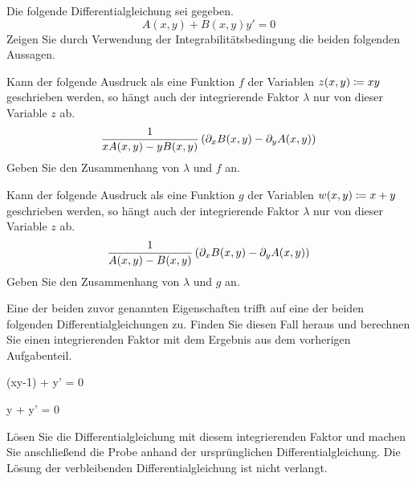 \begin{atiTask}[
	title = Integrierende Faktoren,
	topic = Gewöhnliche Differentialgleichungen,
	subtopic = Exakte Differentialgleichungen: Der integrierende Faktor,
	language = Deutsch
]
	\begin{atiSubtasks}
		\item{
			Die folgende Differentialgleichung sei gegeben.
			\[
				A(x,y) + B(x,y)y' = 0
			\]
			Zeigen Sie durch Verwendung der Integrabilitätsbedingung die beiden folgenden Aussagen.
			\begin{atiItems}
				\item{
					Kann der folgende Ausdruck als eine Funktion $f$ der Variablen $z(x,y)\coloneqq xy$ geschrieben werden, so hängt auch der integrierende Faktor $\lambda$ nur von dieser Variable $z$ ab.
					\[
						\frac{1}{xA(x,y)-yB(x,y)}\left( \partial_x B(x,y) - \partial_y A(x,y) \right)
					\]
					Geben Sie den Zusammenhang von $\lambda$ und $f$ an.
				}
				\item{
					Kann der folgende Ausdruck als eine Funktion $g$ der Variablen $w(x,y)\coloneqq x + y$ geschrieben werden, so hängt auch der integrierende Faktor $\lambda$ nur von dieser Variable $z$ ab.
					\[
						\frac{1}{A(x,y)-B(x,y)}\left( \partial_x B(x,y) - \partial_y A(x,y) \right)
					\]
					Geben Sie den Zusammenhang von $\lambda$ und $g$ an.

				}
			\end{atiItems}
		}
		\item{
			Eine der beiden zuvor genannten Eigenschaften trifft auf eine der beiden folgenden Differentialgleichungen zu.
			Finden Sie diesen Fall heraus und berechnen Sie einen integrierenden Faktor mit dem Ergebnis aus dem vorherigen Aufgabenteil.
			\begin{atiSubequations}
				\item{
					(xy-1) + y' = 0
				}
				\item{
					y + y' = 0
				}
			\end{atiSubequations}
			Lösen Sie die Differentialgleichung mit diesem integrierenden Faktor und machen Sie anschließend die Probe anhand der ursprünglichen Differentialgleichung.
			Die Lösung der verbleibenden Differentialgleichung ist nicht verlangt.
		}
	\end{atiSubtasks}
\end{atiTask}